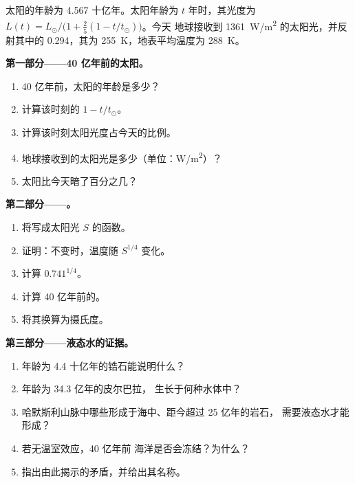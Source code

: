 \begin{problem}
\label{pb:g12:early-earth:1}
 太阳的年龄为 \num{4.567} 十亿年。太阳年龄为 $t$
 年时，其光度为 $L(t) = L_\odot/\bigl(1 + \tfrac25 (1 - t/t_\odot)\bigr)$。今天
 地球接收到 \qty{1361}{W/m^2} 的太阳光，并反射其中的
 0.294，其为 \qty{255}{K}，地表平均温度为
 \qty{288}{K}。

\medskip
\noindent\textbf{第一部分——40 亿年前的太阳。}
\begin{enumerate}
  \item 40 亿年前，太阳的年龄是多少？
  \item 计算该时刻的 $1 - t/t_\odot$。
  \item 计算该时刻太阳光度占今天的比例。
  \item 地球接收到的太阳光是多少（单位：\unit{W/m^2}）？
  \item 太阳比今天暗了百分之几？
\end{enumerate}

\medskip
\noindent\textbf{第二部分——。}
\begin{enumerate}[resume]
  \item 将写成太阳光 $S$ 的函数。
  \item 证明：不变时，温度随
        $S^{1/4}$ 变化。
  \item 计算 $0.741^{1/4}$。
  \item 计算 40 亿年前的。
  \item 将其换算为摄氏度。
\end{enumerate}

\medskip
\noindent\textbf{第三部分——液态水的证据。}
\begin{enumerate}[resume]
  \item 年龄为 4.4 十亿年的锆石能说明什么？
  \item 年龄为 34.3 亿年的皮尔巴拉，
        生长于何种水体中？
  \item 哈默斯利山脉中哪些形成于海中、距今超过 25 亿年的岩石，
        需要液态水才能形成？
  \item 若无温室效应，40 亿年前
        海洋是否会冻结？为什么？
  \item 指出由此揭示的矛盾，并给出其名称。
\end{enumerate}


\end{problem}
